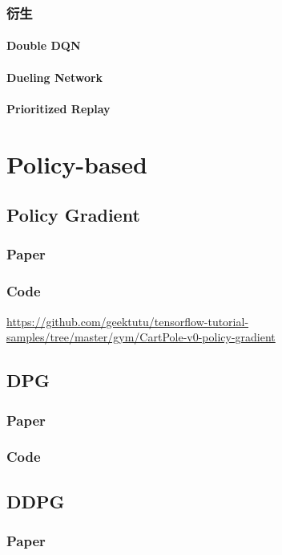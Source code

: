 \documentclass{book}
\begin{document}
\subsection{衍生}
\subsubsection{Double DQN}
\subsubsection{Dueling Network}
\subsubsection{Prioritized Replay}
\chapter{Policy-based}
\section{Policy Gradient}
\subsection{Paper}
\subsection{Code}
\noindent \url{https://github.com/geektutu/tensorflow-tutorial-samples/tree/master/gym/CartPole-v0-policy-gradient}
\section{DPG}
\subsection{Paper}
\subsection{Code}
\section{DDPG}
\subsection{Paper}
\end{document}
